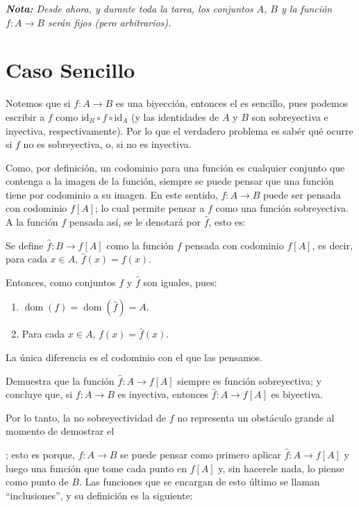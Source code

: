 \documentclass[letterpaper,DIV=14,headsepline,12pt]{scrartcl}
\newcommand{\pts}{}
\newenvironment{ejercicio}[1]{\ifthenelse{\equal{#1}{1} \OR \equal{#1}{+1}}{\renewcommand{\pts}{\textbf{(#1 pt)}}}{\renewcommand{\pts}{\textbf{(#1 pts)}}}\begin{ejj}\upshape \pts}{\end{ejj}}
\newcommand{\id}{\mathrm{id}}
\DeclareMathOperator{\dom}{dom}
\begin{document}
    \textit{\textbf{Nota:} Desde ahora, y durante toda la tarea, los conjuntos $A$, $B$ y la función $f:A \to B$ serán fijos (pero arbitrarios).}

    \section*{Caso Sencillo}

    Notemos que si $f:A \to B$ es una biyección, entonces el es sencillo, pues podemos escribir a $f$ como $\id_B \circ f \circ \id_A$ (y las identidades de $A$ y $B$ son sobreyectiva e inyectiva, respectivamente). Por lo que el verdadero problema es sabér qué ocurre si $f$ no es sobreyectiva, o, si no es inyectiva.

    Como, por definición, un codominio para una función es cualquier conjunto que contenga a la imagen de la función, siempre se puede pensar que una función tiene por codominio a su imagen. En este sentido, $f:A \to B$ puede ser pensada con codominio $f[A]$; lo cual permite pensar a $f$ como una función sobreyectiva. A la función $f$ pensada así, se le denotará por $\hat{f}$, esto es:

    \begin{definicion}
        Se define $\hat{f}:B \to f[A]$ como la función $f$ pensada con codominio $f[A]$, es decir, para cada $x \in A$, $\hat{f}(x)=f(x)$.
    \end{definicion}

    Entonces, como conjuntos $f$ y $\hat{f}$ son iguales, pues:
    \begin{enumerate}
        \item $\dom(f)=\dom(\hat{f})=A$.
        \item Para cada $x \in A$, $f(x)=\hat{f}(x)$.
    \end{enumerate}
    
    La única diferencia es el codominio con el que las pensamos.

    \begin{ejercicio}{1}\label{ej:sobresuimagen}
        Demuestra que la función $\hat{f}:A \to f[A]$ siempre es función sobreyectiva; y concluye que, si $f:A \to B$ es inyectiva, entonces $\hat{f}:A \to f[A]$ es biyectiva.
    \end{ejercicio}

    Por lo tanto, la no sobreyectividad de $f$ no representa un obstáculo grande al momento de demostrar el \author{teo:primero}; esto es porque, $f:A \to B$ se puede pensar como primero aplicar $\hat{f}:A \to f[A]$ y luego una función que tome cada punto en $f[A]$ y, sin hacerele nada, lo piense como punto de $B$. Las funciones que se encargan de esto último se llaman ``inclusiones'', y su definición es la siguiente:
\end{document}
